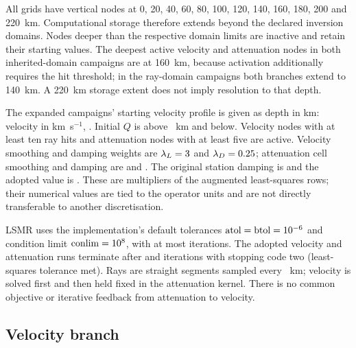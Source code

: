 \documentclass[review,authoryear,longtitle]{elsarticle}
\begin{document}
All grids have vertical nodes at 0, 20, 40, 60, 80, 100, 120, 140,
160, 180, 200 and 220~km. Computational storage therefore extends beyond
the declared inversion domains. Nodes deeper than the respective domain
limits are inactive and retain their starting values. The deepest active
velocity and attenuation nodes in both inherited-domain campaigns are at
160~km, because activation additionally requires the hit threshold; in the
ray-domain campaigns both branches extend to 140~km. A 220~km storage
extent does not imply resolution to that depth.

The expanded campaigns' starting velocity profile is given as depth in km:
velocity in km~s$^{-1}$, \perfilVpInicial. Initial $Q$ is
\qInicialSomero{} above \profCambioQ~km and \qInicialProfundo{} below.
Velocity nodes with at least ten ray hits and attenuation nodes with at
least five are active. Velocity smoothing and damping weights are
$\lambda_L=3$ and $\lambda_D=0.25$; attenuation cell smoothing
and damping are \qLaplace{} and \qCellDamp. The original station damping
is \qStationDampPrevio{} and the adopted value is \qStationDamp.
These are multipliers of the augmented least-squares rows; their numerical
values are tied to the operator units and are not directly transferable
to another discretisation.

LSMR uses the implementation's default tolerances
$\mathrm{atol}=\mathrm{btol}=10^{-6}$ and condition limit
$\mathrm{conlim}=10^{8}$, with at most \lsmrMaxIter{} iterations.
The adopted velocity and attenuation runs terminate after
\vpIterAdoptada{} and \qIterRevision{} iterations with stopping code two
(least-squares tolerance met). Rays are straight segments sampled every
\pasoRayo~km; velocity is solved first and then held fixed in the
attenuation kernel. There is no common objective or iterative feedback
from attenuation to velocity.

\subsection{Velocity branch}
\end{document}
